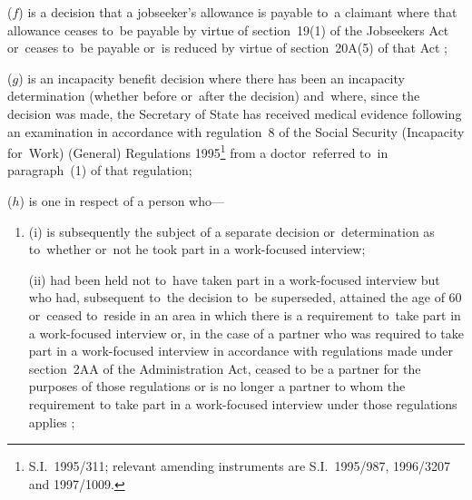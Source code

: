 \documentclass[12pt,a4paper]{article}
\begin{document}
\begin{enumerate}

($f$) is a decision that a jobseeker’s allowance is payable to~a claimant where that allowance ceases to~be payable by virtue of section~19(1) of the Jobseekers Act
or~ceases to~be payable or~is reduced by virtue of section~20A(5) of that Act%
;

($g$) is an incapacity benefit decision where there has been an incapacity determination (whether before or~after the decision) and~where, since the decision was made, the Secretary of State has received medical evidence following an examination in accordance with regulation~8 of the Social Security (Incapacity for~Work) (General) Regulations 1995\footnote{\frenchspacing S.I.~1995/311; relevant amending instruments are S.I.~1995/987, 1996/3207 and 1997/1009.} from a doctor~referred to~in paragraph~(1) of that regulation;

($h$) is one in respect of a person who—
\begin{enumerate}\item[]
(i) is subsequently the subject of a separate decision or~determination as to~whether or~not he took part in a work-focused interview;

(ii) had been held not to~have taken part in a work-focused interview but who had, subsequent to~the decision to~be superseded, attained the age of 60 or~ceased to~reside in an area in which there is a requirement to~take part in a work-focused interview
or, in the case of a partner who was required to take part in a work-focused interview 
in accordance with regulations made under section~2AA of the Administration Act, ceased to be a partner for the purposes of those regulations or is no longer a partner to whom the requirement to take part in a work-focused interview under those regulations applies%
;
\end{enumerate}


\end{enumerate}
\end{document}
